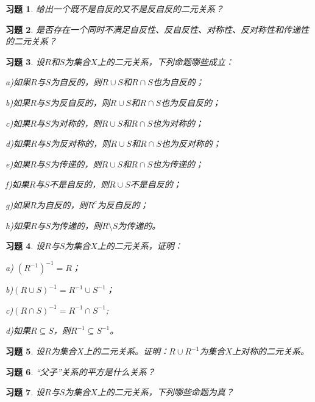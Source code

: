 \documentclass{article}
\begin{document}
\begin{CJK}{UTF8}{gbsn}
\newtheorem{Exercise}{习题}
\begin{Exercise}
给出一个既不是自反的又不是反自反的二元关系？
\end{Exercise}
\vspace{3cm}
\begin{Exercise}
是否存在一个同时不满足自反性、反自反性、对称性、反对称性和传递性的二元关系？
\end{Exercise}
\vspace{3cm}
\begin{Exercise}
设$R$和$S$为集合$X$上的二元关系，下列命题哪些成立：

a)如果$R$与$S$为自反的，则$R\cup S$和$R\cap S$也为自反的；

b)如果$R$与$S$为反自反的，则$R\cup S$和$R\cap S$也为反自反的；

c)如果$R$与$S$为对称的，则$R\cup S$和$R\cap S$也为对称的；

d)如果$R$与$S$为反对称的，则$R\cup S$和$R\cap S$也为反对称的；

e)如果$R$与$S$为传递的，则$R\cup S$和$R\cap S$也为传递的；

f)如果$R$与$S$不是自反的，则$R\cup S$不是自反的；

g)如果$R$为自反的，则$R^c$为反自反的；

h)如果$R$与$S$为传递的，则$R\setminus S$为传递的。
\end{Exercise}
\vspace{2cm}
\begin{Exercise}
  设$R$与$S$为集合$X$上的二元关系，证明：

  a) $(R^{-1})^{-1}=R$；

  b)$(R\cup S)^{-1}=R^{-1}\cup S^{-1}$；

  c)$(R\cap S)^{-1}=R^{-1}\cap S^{-1}$;

  d)如果$R\subseteq S$，则$R^{-1}\subseteq S^{-1}$。
\end{Exercise}
\vspace{10cm}
\begin{Exercise}
  设$R$为集合$X$上的二元关系。证明：$R\cup R^{-1}$为集合$X$上对称的二元关系。
\end{Exercise}
\vspace{10cm}
\begin{Exercise}
  “父子”关系的平方是什么关系？
\end{Exercise}
\vspace{10cm}
\begin{Exercise}
  设$R$与$S$为集合$X$上的二元关系，下列哪些命题为真？


\end{Exercise}
\end{CJK}
\end{document}
